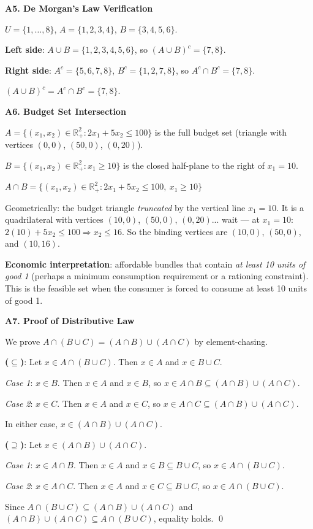 \documentclass[12pt, a4paper]{article}
\theoremstyle{definition}
\newcommand{\R}{\mathbb{R}}
\begin{document}
\begin{solbox}
\textbf{A5. De Morgan's Law Verification}

$U=\{1,\ldots,8\}$, $A=\{1,2,3,4\}$, $B=\{3,4,5,6\}$.

\textbf{Left side}: $A\cup B = \{1,2,3,4,5,6\}$, so $(A\cup B)^c = \{7,8\}$.

\textbf{Right side}: $A^c = \{5,6,7,8\}$, $B^c = \{1,2,7,8\}$, so $A^c\cap B^c = \{7,8\}$.

$(A\cup B)^c = A^c \cap B^c = \{7,8\}$. \checkmark
\end{solbox}

\begin{solbox}
\textbf{A6. Budget Set Intersection}

$A = \{(x_1,x_2)\in\R^2_+ : 2x_1+5x_2\leq 100\}$ is the full budget set (triangle with vertices $(0,0)$, $(50,0)$, $(0,20)$).

$B = \{(x_1,x_2)\in\R^2_+ : x_1 \geq 10\}$ is the closed half-plane to the right of $x_1=10$.

$A\cap B = \{(x_1,x_2)\in\R^2_+ : 2x_1+5x_2\leq 100,\ x_1\geq 10\}$

Geometrically: the budget triangle \emph{truncated} by the vertical line $x_1=10$. It is a quadrilateral with vertices $(10,0)$, $(50,0)$, $(0,20)$... wait --- at $x_1=10$: $2(10)+5x_2\leq 100 \Rightarrow x_2\leq 16$. So the binding vertices are $(10,0)$, $(50,0)$, and $(10,16)$.

\textbf{Economic interpretation}: affordable bundles that contain \emph{at least 10 units of good 1} (perhaps a minimum consumption requirement or a rationing constraint). This is the feasible set when the consumer is forced to consume at least 10 units of good 1.
\end{solbox}

\begin{solbox}
\textbf{A7. Proof of Distributive Law}

We prove $A\cap(B\cup C) = (A\cap B)\cup(A\cap C)$ by element-chasing.

\textbf{($\subseteq$)}: Let $x \in A\cap(B\cup C)$. Then $x\in A$ and $x\in B\cup C$.

\textit{Case 1}: $x\in B$. Then $x\in A$ and $x\in B$, so $x\in A\cap B\subseteq (A\cap B)\cup(A\cap C)$.

\textit{Case 2}: $x\in C$. Then $x\in A$ and $x\in C$, so $x\in A\cap C\subseteq (A\cap B)\cup(A\cap C)$.

In either case, $x\in(A\cap B)\cup(A\cap C)$.

\textbf{($\supseteq$)}: Let $x\in(A\cap B)\cup(A\cap C)$.

\textit{Case 1}: $x\in A\cap B$. Then $x\in A$ and $x\in B\subseteq B\cup C$, so $x\in A\cap(B\cup C)$.

\textit{Case 2}: $x\in A\cap C$. Then $x\in A$ and $x\in C\subseteq B\cup C$, so $x\in A\cap(B\cup C)$.

Since $A\cap(B\cup C)\subseteq(A\cap B)\cup(A\cap C)$ and $(A\cap B)\cup(A\cap C)\subseteq A\cap(B\cup C)$, equality holds. \qed
\end{solbox}
\end{document}
